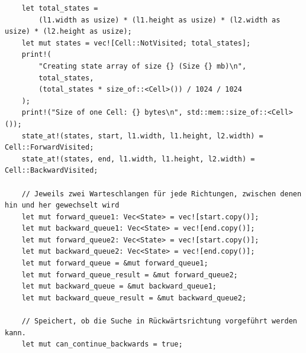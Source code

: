 \documentclass[a4paper,10pt,ngerman]{scrartcl}
\begin{document}
\begin{verbatim}
    let total_states =
        (l1.width as usize) * (l1.height as usize) * (l2.width as usize) * (l2.height as usize);
    let mut states = vec![Cell::NotVisited; total_states];
    print!(
        "Creating state array of size {} (Size {} mb)\n",
        total_states,
        (total_states * size_of::<Cell>()) / 1024 / 1024
    );
    print!("Size of one Cell: {} bytes\n", std::mem::size_of::<Cell>());
    state_at!(states, start, l1.width, l1.height, l2.width) = Cell::ForwardVisited;
    state_at!(states, end, l1.width, l1.height, l2.width) = Cell::BackwardVisited;

    // Jeweils zwei Warteschlangen für jede Richtungen, zwischen denen hin und her gewechselt wird
    let mut forward_queue1: Vec<State> = vec![start.copy()];
    let mut backward_queue1: Vec<State> = vec![end.copy()];
    let mut forward_queue2: Vec<State> = vec![start.copy()];
    let mut backward_queue2: Vec<State> = vec![end.copy()];
    let mut forward_queue = &mut forward_queue1;
    let mut forward_queue_result = &mut forward_queue2;
    let mut backward_queue = &mut backward_queue1;
    let mut backward_queue_result = &mut backward_queue2;

    // Speichert, ob die Suche in Rückwärtsrichtung vorgeführt werden kann.
    let mut can_continue_backwards = true;


\end{verbatim}
\end{document}

